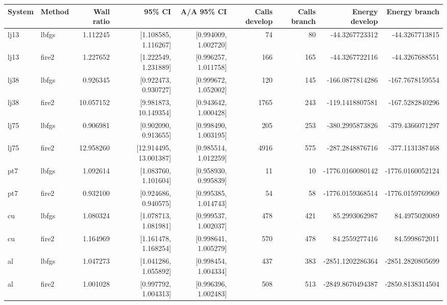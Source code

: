 \begin{tabular}{llrrrrrrr}
\toprule
System & Method & Wall ratio & 95\% CI & A/A 95\% CI & Calls develop & Calls branch & Energy develop & Energy branch \\
\midrule
lj13 & lbfgs & 1.112245 & [1.108585, 1.116267] & [0.994009, 1.002720] & 74 & 80 & -44.3267723312 & -44.3267713815 \\
lj13 & fire2 & 1.227652 & [1.222549, 1.231889] & [0.996257, 1.011758] & 166 & 165 & -44.3267722116 & -44.3267688551 \\
lj38 & lbfgs & 0.926345 & [0.922473, 0.930727] & [0.999672, 1.052002] & 120 & 145 & -166.0877814286 & -167.7678159554 \\
lj38 & fire2 & 10.057152 & [9.981873, 10.149354] & [0.943642, 1.000428] & 1765 & 243 & -119.1418807581 & -167.5282840296 \\
lj75 & lbfgs & 0.906981 & [0.902090, 0.913655] & [0.998490, 1.003195] & 205 & 253 & -380.2995873826 & -379.4366071297 \\
lj75 & fire2 & 12.958260 & [12.914495, 13.001387] & [0.985514, 1.012259] & 4916 & 575 & -287.2848876716 & -377.1131387468 \\
pt7 & lbfgs & 1.092614 & [1.083760, 1.101604] & [0.958930, 0.995839] & 11 & 10 & -1776.0160080142 & -1776.0160052124 \\
pt7 & fire2 & 0.932100 & [0.924686, 0.940575] & [0.995385, 1.014743] & 54 & 58 & -1776.0159368514 & -1776.0159769969 \\
cu & lbfgs & 1.080324 & [1.078713, 1.081981] & [0.999537, 1.002037] & 478 & 421 & 85.2993062987 & 84.4975020089 \\
cu & fire2 & 1.164969 & [1.161478, 1.168254] & [0.998641, 1.005279] & 570 & 478 & 84.2559277416 & 84.5998672011 \\
al & lbfgs & 1.047273 & [1.041286, 1.055892] & [0.998454, 1.004334] & 437 & 383 & -2851.1202286364 & -2851.2820805699 \\
al & fire2 & 1.001028 & [0.997792, 1.004313] & [0.996396, 1.002483] & 508 & 513 & -2849.8670494387 & -2850.8138314504 \\
\bottomrule
\end{tabular}
